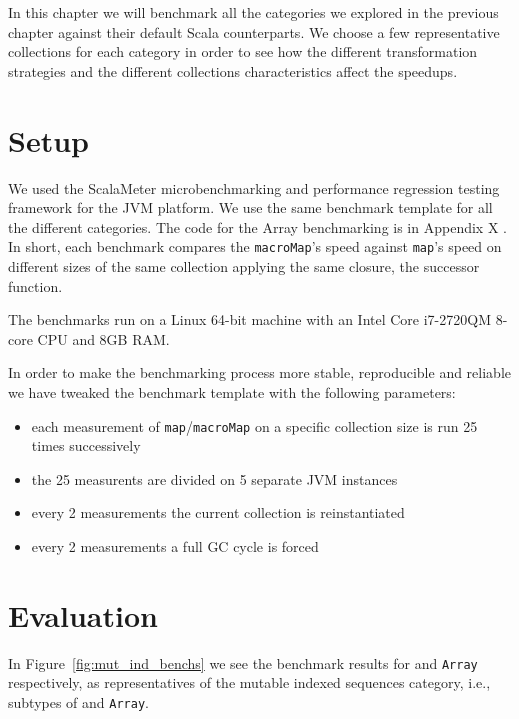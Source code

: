 \label{benchmarks}

In this chapter we will benchmark all the categories we explored in
the previous chapter against their default Scala counterparts. We choose a few
representative collections for each category in order to see how the different
transformation strategies and the different collections characteristics affect
the speedups.

\section{Setup}

We used the ScalaMeter  microbenchmarking and performance regression
testing framework for the JVM platform. We use the same benchmark template for
all the different categories. The code for the Array benchmarking is in Appendix X
. In short, each benchmark compares the \texttt{macroMap}'s speed against \texttt{map}'s speed
on different sizes of the same collection applying the same closure, the
successor function.

The benchmarks run on a Linux 64-bit machine with an Intel Core i7-2720QM 8-core
CPU and 8GB RAM.

In order to make the benchmarking process more stable, reproducible and reliable
we have tweaked the benchmark template with the following parameters:

\begin{itemize}
 \item 
  each measurement of \texttt{map}/\texttt{macroMap} on a specific collection size is run 25
times successively
 \item
  the 25 measurents are divided on 5 separate JVM instances
 \item
  every 2 measurements the current collection is reinstantiated
 \item
  every 2 measurements a full GC cycle is forced
\end{itemize}


\section{Evaluation}

In Figure~\ref{fig:mut_ind_benchs} we see the benchmark results for  
and \texttt{Array} respectively, as representatives of the mutable indexed
sequences category, i.e., subtypes of  and
\texttt{Array}.

